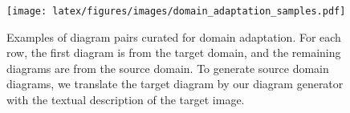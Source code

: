 \begin{figure}[t!]
    \centering
    \texttt{[image: latex/figures/images/domain\_adaptation\_samples.pdf]}
    \caption{Examples of diagram pairs curated for domain adaptation. For each row, the first diagram is from the target domain, and the remaining diagrams are from the source domain. To generate source domain diagrams, we translate the target diagram by our diagram generator with the textual description of the target image.}
    \label{fig:domain_adaptation_samples}
\end{figure}
